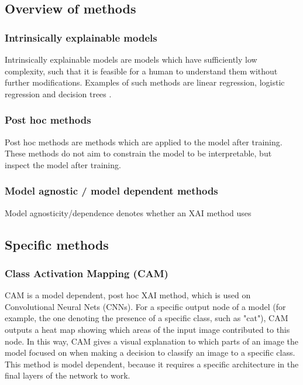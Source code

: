 \documentclass[conference]{IEEEtran}
\begin{document}
\subsection{Overview of methods}

\subsubsection{Intrinsically explainable models}

Intrinsically explainable models are models which have sufficiently low complexity, such that it is feasible for a human to understand them without further modifications. Examples of such methods are linear regression, logistic regression and decision trees \cite{molnar}.

\subsubsection{Post hoc methods}

Post hoc methods are methods which are applied to the model after training. These methods do not aim to constrain the model to be interpretable, but inspect the model after training.

\subsubsection{Model agnostic / model dependent methods}

Model agnosticity/dependence denotes whether an XAI method uses 

\subsection{Specific methods}

\subsubsection{Class Activation Mapping (CAM)}

CAM \cite{cam} is a model dependent, post hoc XAI method, which is used on Convolutional Neural Nets (CNNs). For a specific output node of a model (for example, the one denoting the presence of a specific class, such as "cat"), CAM outputs a heat map showing which areas of the input image contributed to this node. In this way, CAM gives a visual explanation to which parts of an image the model focused on when making a decision to classify an image to a specific class. This method is model dependent, because it requires a specific architecture in the final layers of the network to work.
\end{document}
